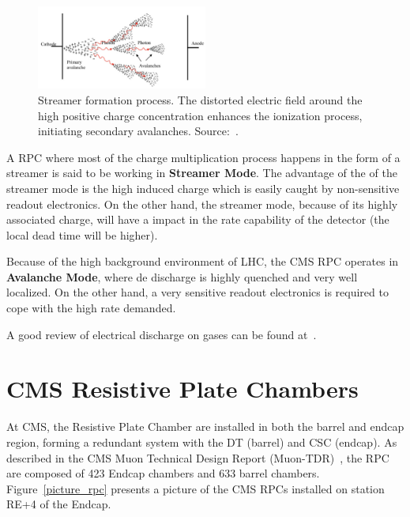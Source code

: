 \begin{figure}[h]
    \begin{center}
    \includegraphics[width=0.5\textwidth,keepaspectratio]{figures_and_tables/rpc/streamer.png}
    \end{center}
    \caption{Streamer formation process. The distorted electric field around the high positive charge concentration enhances the ionization process, initiating secondary avalanches. Source:~\cite{livro_descarga}.}
    \label{streamer}
\end{figure}

A RPC where most of the charge multiplication process happens in the form of a streamer is said to be working in \textbf{Streamer Mode}. The advantage of the of the streamer mode is the high induced charge which is easily caught by non-sensitive readout electronics. On the other hand, the streamer mode, because of its highly associated charge, will have a impact in the rate capability of the detector (the local dead time will be higher).

Because of the high background environment of LHC, the CMS RPC operates in \textbf{Avalanche Mode}, where de discharge is highly quenched and very well localized. On the other hand, a very sensitive readout electronics is required to cope with the high rate demanded.

A good review of electrical discharge on gases can be found at~\cite{livro_descarga}.

\section{CMS Resistive Plate Chambers}

At CMS, the Resistive Plate Chamber are installed in both the barrel and endcap region, forming a redundant system with the DT (barrel) and CSC (endcap). As described in the CMS Muon Technical Design Report (Muon-TDR)~\cite{muon_tdr}, the RPC are composed of 423 Endcap chambers and 633 barrel chambers. Figure~\ref{picture_rpc} presents a picture of the CMS RPCs installed on station RE+4 of the Endcap.

